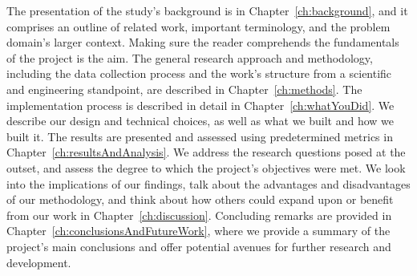 \documentclass[nomenclature, english, bibtex]{kththesis}
\begin{document}

The presentation of the study's background is in Chapter~\ref{ch:background}, and it comprises an outline of related work, important terminology, and the problem domain's larger context. Making sure the reader comprehends the fundamentals of the project is the aim. The general research approach and methodology, including the data collection process and the work's structure from a scientific and engineering standpoint, are described in Chapter~\ref{ch:methods}. The implementation process is described in detail in Chapter~\ref{ch:whatYouDid}. We describe our design and technical choices, as well as what we built and how we built it. The results are presented and assessed using predetermined metrics in Chapter~\ref{ch:resultsAndAnalysis}. We address the research questions posed at the outset, and assess the degree to which the project's objectives were met. We look into the implications of our findings, talk about the advantages and disadvantages of our methodology, and think about how others could expand upon or benefit from our work in Chapter~\ref{ch:discussion}. Concluding remarks are provided in Chapter~\ref{ch:conclusionsAndFutureWork}, where we provide a summary of the project's main conclusions and offer potential avenues for further research and development.
\end{document}
